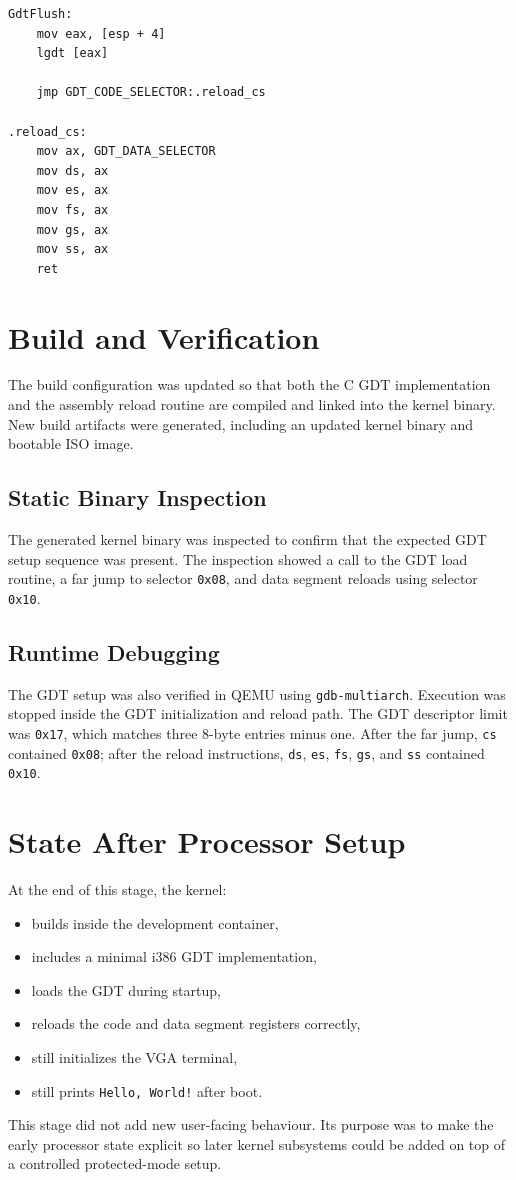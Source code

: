 \begin{listing}[H]
\begin{verbatim}
GdtFlush:
    mov eax, [esp + 4]
    lgdt [eax]

    jmp GDT_CODE_SELECTOR:.reload_cs

.reload_cs:
    mov ax, GDT_DATA_SELECTOR
    mov ds, ax
    mov es, ax
    mov fs, ax
    mov gs, ax
    mov ss, ax
    ret
\end{verbatim}
\caption{Loading the GDT and refreshing the cached code and data segment registers.}
\end{listing}

\section{Build and Verification}

The build configuration was updated so that both the C GDT implementation and the assembly reload routine are compiled and linked into the kernel binary. New build artifacts were generated, including an updated kernel binary and bootable ISO image.

\subsection{Static Binary Inspection}
The generated kernel binary was inspected to confirm that the expected GDT setup sequence was present. The inspection showed a call to the GDT load routine, a far jump to selector \texttt{0x08}, and data segment reloads using selector \texttt{0x10}.

\subsection{Runtime Debugging}
The GDT setup was also verified in QEMU using \texttt{gdb-multiarch}. Execution was stopped inside the GDT initialization and reload path. The GDT descriptor limit was \texttt{0x17}, which matches three 8-byte entries minus one. After the far jump, \texttt{cs} contained \texttt{0x08}; after the reload instructions, \texttt{ds}, \texttt{es}, \texttt{fs}, \texttt{gs}, and \texttt{ss} contained \texttt{0x10}.

\section{State After Processor Setup}

At the end of this stage, the kernel:
\begin{itemize}
  \item builds inside the development container,
  \item includes a minimal i386 GDT implementation,
  \item loads the GDT during startup,
  \item reloads the code and data segment registers correctly,
  \item still initializes the VGA terminal,
  \item still prints \texttt{Hello, World!} after boot.
\end{itemize}

This stage did not add new user-facing behaviour. Its purpose was to make the early processor state explicit so later kernel subsystems could be added on top of a controlled protected-mode setup.
